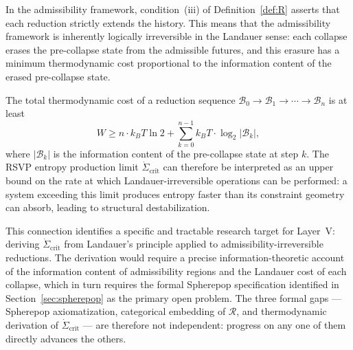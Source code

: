 \documentclass[12pt, a4paper]{article}
\theoremstyle{plain}
\theoremstyle{definition}
\theoremstyle{remark}
\newcommand{\Bcal}{\mathcal{B}}
\begin{document}
In the admissibility framework, condition~(iii) of Definition~\ref{def:R} asserts that
each reduction strictly extends the history. This means that the admissibility framework
is inherently logically irreversible in the Landauer sense: each collapse erases the
pre-collapse state from the admissible futures, and this erasure has a minimum
thermodynamic cost proportional to the information content of the erased pre-collapse
state.

The total thermodynamic cost of a reduction sequence $\Bcal_0 \to \Bcal_1 \to \cdots
\to \Bcal_n$ is at least
\[
  W \geq n \cdot k_B T \ln 2 + \sum_{k=0}^{n-1} k_B T \cdot \log_2 |\Bcal_k|,
\]
where $|\Bcal_k|$ is the information content of the pre-collapse state at step $k$.
The RSVP entropy production limit $\dot{\Sigma}_{\mathrm{crit}}$ can therefore be
interpreted as an upper bound on the rate at which Landauer-irreversible operations
can be performed: a system exceeding this limit produces entropy faster than its
constraint geometry can absorb, leading to structural destabilization.

This connection identifies a specific and tractable research target for Layer~V:
deriving $\dot{\Sigma}_{\mathrm{crit}}$ from Landauer's principle applied to
admissibility-irreversible reductions. The derivation would require a precise
information-theoretic account of the information content of admissibility regions and
the Landauer cost of each collapse, which in turn requires the formal Spherepop
specification identified in Section~\ref{sec:spherepop} as the primary open problem.
The three formal gaps — Spherepop axiomatization, categorical embedding of $\mathcal{R}$,
and thermodynamic derivation of $\dot{\Sigma}_{\mathrm{crit}}$ — are therefore not
independent: progress on any one of them directly advances the others.
\end{document}
